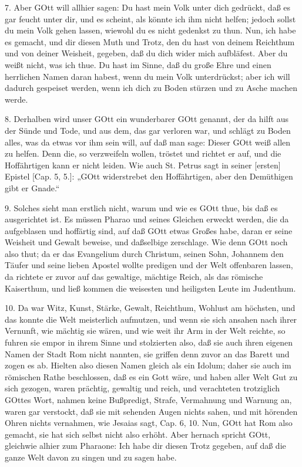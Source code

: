 7. Aber GOtt will allhier sagen: Du hast mein Volk unter dich gedrückt, daß es gar feucht unter dir, und es scheint, als könnte ich ihm nicht helfen; jedoch sollst du mein Volk gehen lassen, wiewohl du es nicht gedenkst zu thun. Nun, ich habe es gemacht, und dir diesen Muth und Trotz, den du hast von deinem Reichthum und von deiner Weisheit, gegeben, daß du dich wider mich aufbläfest. Aber du weißt nicht, was ich thue. Du hast im Sinne, daß du große Ehre und einen herrlichen Namen daran habest, wenn du mein Volk unterdrückst; aber ich will dadurch gespeiset werden, wenn ich dich zu Boden stürzen und zu Asche machen werde.

8. Derhalben wird unser GOtt ein wunderbarer GOtt genannt, der da hilft aus der Sünde und Tode, und aus dem, das gar verloren war, und schlägt zu Boden alles, was da
etwas vor ihm sein will, auf daß man sage: Dieser GOtt weiß allen zu helfen. Denn die, so verzweifeln wollen, tröstet und richtet er auf, und die Hoffährtigen kann er nicht leiden. Wie auch St. Petrus sagt in seiner [ersten] Epistel [Cap. 5, 5.]: „GOtt widerstrebet den Hoffährtigen, aber den Demüthigen gibt er Gnade.“

9. Solches sieht man erstlich nicht, warum und wie es GOtt thue, bis daß es ausgerichtet ist. Es müssen Pharao und seines Gleichen erweckt werden, die da aufgeblasen und hoffärtig sind, auf daß GOtt etwas Großes habe, daran er seine Weisheit und Gewalt beweise, und daßselbige zerschlage. Wie denn GOtt noch also thut; da er das Evangelium durch Christum, seinen Sohn, Johannem den Täufer und seine lieben Apostel wollte predigen und der Welt offenbaren lassen, da richtete er zuvor auf das gewaltige, mächtige Reich, als das römische Kaiserthum, und ließ kommen die weisesten und heiligsten Leute im Judenthum.

10. Da war Witz, Kunst, Stärke, Gewalt, Reichthum, Wohlust am höchsten, und das konnte die Welt meisterlich aufmutzen, und wenn sie sich ansahen nach ihrer Vernunft, wie mächtig sie wären, und wie weit ihr Arm in der Welt reichte, so fuhren sie empor in ihrem Sinne und stolzierten also, daß sie auch ihren eigenen Namen der Stadt Rom nicht nannten, sie griffen denn zuvor an das Barett und zogen es ab. Hielten also diesen Namen gleich als ein Idolum; daher sie auch im römischen Rathe beschlossen, daß es ein Gott wäre, und haben aller Welt Gut zu sich gezogen, waren prächtig, gewaltig und reich, und verachteten trotziglich GOttes Wort, nahmen keine Bußpredigt, Strafe, Vermahnung und Warnung an, waren gar verstockt, daß sie mit sehenden Augen nichts sahen, und mit hörenden Ohren nichts vernahmen, wie Jesaias sagt, Cap. 6, 10. Nun, GOtt hat Rom also gemacht, sie hat sich selbst nicht also erhöht. Aber hernach spricht GOtt, gleichwie alhier zum Pharaone: Ich habe dir diesen Trotz gegeben, auf daß die ganze Welt davon zu singen und zu sagen habe.

